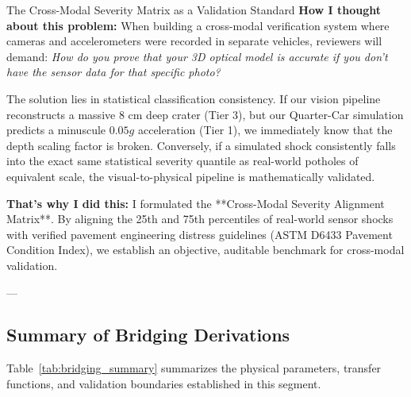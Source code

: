 \begin{designreflection}{The Cross-Modal Severity Matrix as a Validation Standard}
\textbf{How I thought about this problem:}
When building a cross-modal verification system where cameras and accelerometers were recorded in separate vehicles, reviewers will demand: \textit{How do you prove that your 3D optical model is accurate if you don't have the sensor data for that specific photo?}

The solution lies in statistical classification consistency. If our vision pipeline reconstructs a massive $8\text{ cm}$ deep crater (Tier 3), but our Quarter-Car simulation predicts a minuscule $0.05g$ acceleration (Tier 1), we immediately know that the depth scaling factor is broken. Conversely, if a simulated shock consistently falls into the exact same statistical severity quantile as real-world potholes of equivalent scale, the visual-to-physical pipeline is mathematically validated.

\textbf{That's why I did this:}
I formulated the **Cross-Modal Severity Alignment Matrix**. By aligning the 25th and 75th percentiles of real-world sensor shocks with verified pavement engineering distress guidelines (ASTM D6433 Pavement Condition Index), we establish an objective, auditable benchmark for cross-modal validation.
\end{designreflection}

---

\subsection{Summary of Bridging Derivations}
Table~\ref{tab:bridging_summary} summarizes the physical parameters, transfer functions, and validation boundaries established in this segment.

